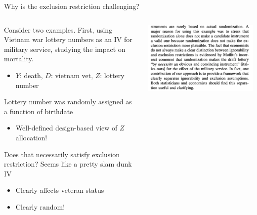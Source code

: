 \documentclass[notes,11pt, aspectratio=169]{beamer}
\newenvironment{wideitemize}{\itemize\addtolength{\itemsep}{10pt}}{\enditemize}
\begin{document}
\begin{frame}{Why is the exclusion restriction challenging?}
  \begin{columns}[T] %
    \begin{column}{0.6\textwidth}
      \begin{wideitemize}
      \item Consider two examples. First, using Vietnam war lottery
        numbers as an IV for military service, studying the impact on
        mortality.
        \begin{itemize}
        \item $Y$: death, $D$: vietnam vet, $Z$: lottery number
        \end{itemize}
      \item Lottery number was randomly assigned as a function of birthdate
        \begin{itemize}
        \item Well-defined design-based view of $Z$ allocation! 
        \end{itemize}
      \item Does that necessarily satisfy exclusion restriction? Seems
        like a pretty slam dunk IV
        \begin{itemize}
        \item Clearly affects veteran status
        \item Clearly random!
        \end{itemize}
  \end{wideitemize}
\end{column}
\begin{column}{0.4\textwidth}
  \includegraphics[width=\linewidth]{images/jasaa.png}
\end{column}
\end{columns}
\end{frame}
\end{document}
